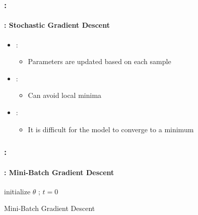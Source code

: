 \documentclass[xcolor=table]{beamer}
\begin{document}
\begin{frame}
	\frametitle{\insertshortsubtitle: \insertsection}
	\framesubtitle{\insertsubsection: Stochastic Gradient Descent}
	
	\begin{itemize}
		\item {}:
		\begin{itemize}
			\item Parameters are updated based on each sample
		\end{itemize}
		\item {}:
		\begin{itemize}
			\item Can avoid local minima
		\end{itemize}
		\item {}:
		\begin{itemize}
			\item It is difficult for the model to converge to a minimum
		\end{itemize}
	\end{itemize}

\end{frame}


\begin{frame}
	\frametitle{\insertshortsubtitle: \insertsection}
	\framesubtitle{\insertsubsection: Mini-Batch Gradient Descent}
	
	\begin{algorithm}[H]
		\KwResult{$ \theta $}
		initialize $ \theta $ ; $ t = 0 $\;
		\caption{Mini-Batch Gradient Descent}
	\end{algorithm}

\end{frame}
\end{document}
